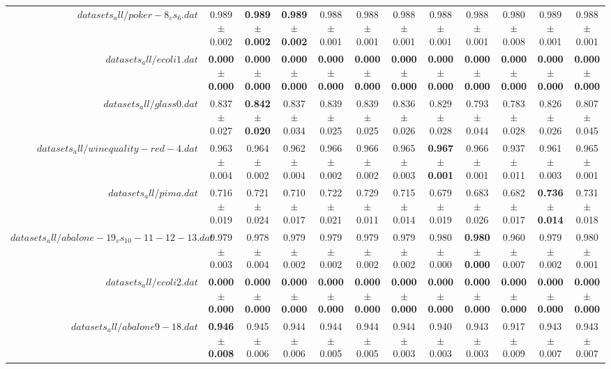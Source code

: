 \begin{table}[!ht]
{\begin{tabular}{r c c c c c c c c c c c}
$datasets_all/poker-8_vs_6.dat$ & 0.989 $\pm$ 0.002 & \textbf{0.989 $\pm$ 0.002} & \textbf{0.989 $\pm$ 0.002} & 0.988 $\pm$ 0.001 & 0.988 $\pm$ 0.001 & 0.988 $\pm$ 0.001 & 0.988 $\pm$ 0.001 & 0.988 $\pm$ 0.001 & 0.980 $\pm$ 0.008 & 0.989 $\pm$ 0.001 & 0.988 $\pm$ 0.001 \\
$datasets_all/ecoli1.dat$ & \textbf{0.000 $\pm$ 0.000} & \textbf{0.000 $\pm$ 0.000} & \textbf{0.000 $\pm$ 0.000} & \textbf{0.000 $\pm$ 0.000} & \textbf{0.000 $\pm$ 0.000} & \textbf{0.000 $\pm$ 0.000} & \textbf{0.000 $\pm$ 0.000} & \textbf{0.000 $\pm$ 0.000} & \textbf{0.000 $\pm$ 0.000} & \textbf{0.000 $\pm$ 0.000} & \textbf{0.000 $\pm$ 0.000} \\
$datasets_all/glass0.dat$ & 0.837 $\pm$ 0.027 & \textbf{0.842 $\pm$ 0.020} & 0.837 $\pm$ 0.034 & 0.839 $\pm$ 0.025 & 0.839 $\pm$ 0.025 & 0.836 $\pm$ 0.026 & 0.829 $\pm$ 0.028 & 0.793 $\pm$ 0.044 & 0.783 $\pm$ 0.028 & 0.826 $\pm$ 0.026 & 0.807 $\pm$ 0.045 \\
$datasets_all/winequality-red-4.dat$ & 0.963 $\pm$ 0.004 & 0.964 $\pm$ 0.002 & 0.962 $\pm$ 0.004 & 0.966 $\pm$ 0.002 & 0.966 $\pm$ 0.002 & 0.965 $\pm$ 0.003 & \textbf{0.967 $\pm$ 0.001} & 0.966 $\pm$ 0.001 & 0.937 $\pm$ 0.011 & 0.961 $\pm$ 0.003 & 0.965 $\pm$ 0.001 \\
$datasets_all/pima.dat$ & 0.716 $\pm$ 0.019 & 0.721 $\pm$ 0.024 & 0.710 $\pm$ 0.017 & 0.722 $\pm$ 0.021 & 0.729 $\pm$ 0.011 & 0.715 $\pm$ 0.014 & 0.679 $\pm$ 0.019 & 0.683 $\pm$ 0.026 & 0.682 $\pm$ 0.017 & \textbf{0.736 $\pm$ 0.014} & 0.731 $\pm$ 0.018 \\
$datasets_all/abalone-19_vs_10-11-12-13.dat$ & 0.979 $\pm$ 0.003 & 0.978 $\pm$ 0.004 & 0.979 $\pm$ 0.002 & 0.979 $\pm$ 0.002 & 0.979 $\pm$ 0.002 & 0.979 $\pm$ 0.002 & 0.980 $\pm$ 0.000 & \textbf{0.980 $\pm$ 0.000} & 0.960 $\pm$ 0.007 & 0.979 $\pm$ 0.002 & 0.980 $\pm$ 0.001 \\
$datasets_all/ecoli2.dat$ & \textbf{0.000 $\pm$ 0.000} & \textbf{0.000 $\pm$ 0.000} & \textbf{0.000 $\pm$ 0.000} & \textbf{0.000 $\pm$ 0.000} & \textbf{0.000 $\pm$ 0.000} & \textbf{0.000 $\pm$ 0.000} & \textbf{0.000 $\pm$ 0.000} & \textbf{0.000 $\pm$ 0.000} & \textbf{0.000 $\pm$ 0.000} & \textbf{0.000 $\pm$ 0.000} & \textbf{0.000 $\pm$ 0.000} \\
$datasets_all/abalone9-18.dat$ & \textbf{0.946 $\pm$ 0.008} & 0.945 $\pm$ 0.006 & 0.944 $\pm$ 0.006 & 0.944 $\pm$ 0.005 & 0.944 $\pm$ 0.005 & 0.944 $\pm$ 0.003 & 0.940 $\pm$ 0.003 & 0.943 $\pm$ 0.003 & 0.917 $\pm$ 0.009 & 0.943 $\pm$ 0.007 & 0.943 $\pm$ 0.007 \\

\end{tabular}}
\end{table}
